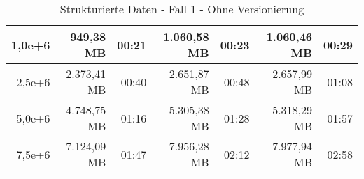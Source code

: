\begin{table}
\begin{tabular}{|r|r|r|r|r|r|r|}
        1,0e+6          & 949,38 MB           & 00:21           & 1.060,58 MB         & 00:23           & 1.060,46 MB         & 00:29           \\ \hline
        2,5e+6          & 2.373,41 MB         & 00:40           & 2.651,87 MB         & 00:48           & 2.657,99 MB         & 01:08           \\ \hline
        5,0e+6          & 4.748,75 MB         & 01:16           & 5.305,38 MB         & 01:28           & 5.318,29 MB         & 01:57           \\ \hline
        7,5e+6          & 7.124,09 MB         & 01:47           & 7.956,28 MB         & 02:12           & 7.977,94 MB         & 02:58           \\ \hline
    \end{tabular}
    \caption{Strukturierte Daten - Fall 1 - Ohne Versionierung}
\end{table}

